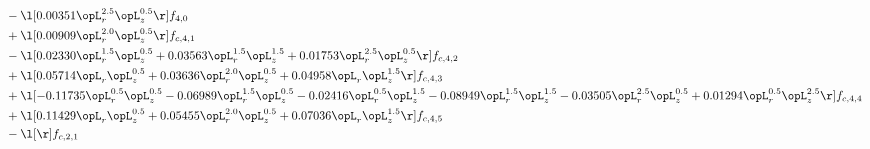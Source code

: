 \begin{alignat}{2}
& - \l[  0.00351 \opL_r^{2.5} \opL_z^{0.5}  \r] f_{4,0} \nonumber \\ 
& + \l[  0.00909 \opL_r^{2.0} \opL_z^{0.5}  \r] f_{c,4,1} \nonumber \\ 
& - \l[  0.02330 \opL_r^{1.5} \opL_z^{0.5} +  0.03563 \opL_r^{1.5} \opL_z^{1.5} +  0.01753 \opL_r^{2.5} \opL_z^{0.5}  \r] f_{c,4,2} \nonumber \\ 
& + \l[  0.05714 \opL_r \opL_z^{0.5} +  0.03636 \opL_r^{2.0} \opL_z^{0.5} +  0.04958 \opL_r \opL_z^{1.5}  \r] f_{c,4,3} \nonumber \\ 
& + \l[  -0.11735 \opL_r^{0.5} \opL_z^{0.5}   -0.06989 \opL_r^{1.5} \opL_z^{0.5}   -0.02416 \opL_r^{0.5} \opL_z^{1.5}   -0.08949 \opL_r^{1.5} \opL_z^{1.5}   -0.03505 \opL_r^{2.5} \opL_z^{0.5} +  0.01294 \opL_r^{0.5} \opL_z^{2.5}  \r] f_{c,4,4} \nonumber \\ 
& + \l[  0.11429 \opL_r \opL_z^{0.5} +  0.05455 \opL_r^{2.0} \opL_z^{0.5} +  0.07036 \opL_r \opL_z^{1.5}  \r] f_{c,4,5} \nonumber \\ 
& - \l[  \r] f_{c,2,1} \nonumber \\ 
\end{alignat} 


